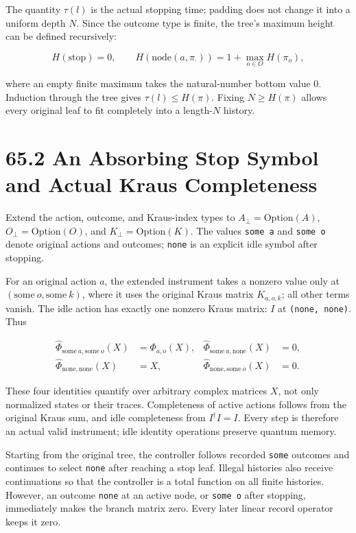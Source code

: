 \documentclass[
  11pt,
  oneside]{book}
\begin{document}
The quantity \(\tau(l)\) is the actual stopping time; padding does not
change it into a uniform depth \(N\). Since the outcome type is finite,
the tree's maximum height can be defined recursively:

\[
H(\mathrm{stop})=0,
\qquad H(\mathrm{node}(a,\pi_\cdot))=1+\max_{o\in O}H(\pi_o),
\]

where an empty finite maximum takes the natural-number bottom value
\(0\). Induction through the tree gives \(\tau(l)\le H(\pi)\). Fixing
\(N\ge H(\pi)\) allows every original leaf to fit completely into a
length-\(N\) history.

\section{65.2 An Absorbing Stop Symbol and Actual Kraus Completeness}

Extend the action, outcome, and Kraus-index types to
\(A_\bot=\mathrm{Option}(A)\), \(O_\bot=\mathrm{Option}(O)\), and
\(K_\bot=\mathrm{Option}(K)\). The values \texttt{some\ a} and
\texttt{some\ o} denote original actions and outcomes; \texttt{none} is
an explicit idle symbol after stopping.

For an original action \(a\), the extended instrument takes a nonzero
value only at \((\mathrm{some}\ o,\mathrm{some}\ k)\), where it uses the
original Kraus matrix \(K_{a,o,k}\); all other terms vanish. The idle
action has exactly one nonzero Kraus matrix: \(I\) at
\texttt{(none,\ none)}. Thus

\[
\begin{aligned}
\widehat\Phi_{\mathrm{some}\ a,\mathrm{some}\ o}(X)&=\Phi_{a,o}(X),&
\widehat\Phi_{\mathrm{some}\ a,\mathrm{none}}(X)&=0,\\
\widehat\Phi_{\mathrm{none},\mathrm{none}}(X)&=X,&
\widehat\Phi_{\mathrm{none},\mathrm{some}\ o}(X)&=0.
\end{aligned}
\]

These four identities quantify over arbitrary complex matrices \(X\),
not only normalized states or their traces. Completeness of active
actions follows from the original Kraus sum, and idle completeness from
\(I^\dagger I=I\). Every step is therefore an actual valid instrument;
idle identity operations preserve quantum memory.

Starting from the original tree, the controller follows recorded
\texttt{some} outcomes and continues to select \texttt{none} after
reaching a stop leaf. Illegal histories also receive continuations so
that the controller is a total function on all finite histories.
However, an outcome \texttt{none} at an active node, or \texttt{some\ o}
after stopping, immediately makes the branch matrix zero. Every later
linear record operator keeps it zero.
\end{document}
